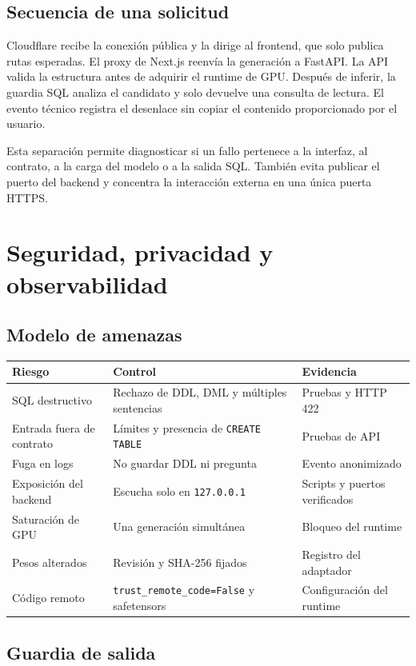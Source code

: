 \documentclass[11pt,letterpaper]{article}
\newcommand{\code}[1]{\texttt{#1}}
\begin{document}
\subsection{Secuencia de una solicitud}

Cloudflare recibe la conexión pública y la dirige al frontend, que solo publica rutas esperadas. El
proxy de Next.js reenvía la generación a FastAPI. La API valida la estructura antes de adquirir el
runtime de GPU. Después de inferir, la guardia SQL analiza el candidato y solo devuelve una consulta
de lectura. El evento técnico registra el desenlace sin copiar el contenido proporcionado por el
usuario.

Esta separación permite diagnosticar si un fallo pertenece a la interfaz, al contrato, a la carga
del modelo o a la salida SQL. También evita publicar el puerto del backend y concentra la interacción
externa en una única puerta HTTPS.

\section{Seguridad, privacidad y observabilidad}

\subsection{Modelo de amenazas}

\begin{tabularx}{\textwidth}{@{}XXX@{}}
\toprule
\textbf{Riesgo} & \textbf{Control} & \textbf{Evidencia}\\
\midrule
SQL destructivo & Rechazo de DDL, DML y múltiples sentencias & Pruebas y HTTP 422\\
Entrada fuera de contrato & Límites y presencia de \code{CREATE TABLE} & Pruebas de API\\
Fuga en logs & No guardar DDL ni pregunta & Evento anonimizado\\
Exposición del backend & Escucha solo en \code{127.0.0.1} & Scripts y puertos verificados\\
Saturación de GPU & Una generación simultánea & Bloqueo del runtime\\
Pesos alterados & Revisión y SHA-256 fijados & Registro del adaptador\\
Código remoto & \code{trust\_remote\_code=False} y safetensors & Configuración del runtime\\
\bottomrule
\end{tabularx}

\subsection{Guardia de salida}
\end{document}
